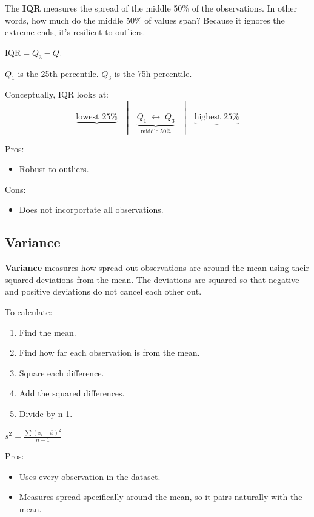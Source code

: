 \documentclass[
  letterpaper,
  DIV=11,
  numbers=noendperiod]{scrreprt}
\providecommand{\tightlist}{%
  \setlength{\itemsep}{0pt}\setlength{\parskip}{0pt}}
\begin{document}
The \textbf{IQR} measures the spread of the middle 50\% of the
observations. In other words, how much do the middle 50\% of values
span? Because it ignores the extreme ends, it's resilient to outliers.

\(\text{IQR} = Q_3 - Q_1\)

\(Q_1\) is the 25th percentile. \(Q_3\) is the 75h percentile.

Conceptually, IQR looks at: \[
\underbrace{\text{lowest 25\%}}_{\phantom{x}}
\quad|\quad
\underbrace{Q_1\; \longleftrightarrow\; Q_3}_{\text{middle 50\%}}
\quad|\quad
\underbrace{\text{highest 25\%}}_{\phantom{x}}
\]

Pros:

\begin{itemize}
\tightlist
\item
  Robust to outliers.
\end{itemize}

Cons:

\begin{itemize}
\tightlist
\item
  Does not incorportate all observations.
\end{itemize}

\subsection{Variance}\label{variance}

\textbf{Variance} measures how spread out observations are around the
mean using their squared deviations from the mean. The deviations are
squared so that negative and positive deviations do not cancel each
other out.

To calculate:

\begin{enumerate}
\def\labelenumi{\arabic{enumi}.}
\tightlist
\item
  Find the mean.
\item
  Find how far each observation is from the mean.
\item
  Square each difference.
\item
  Add the squared differences.
\item
  Divide by n-1.
\end{enumerate}

\(s^2 = \frac{\sum{(x_i - \bar{x})^2}}{n-1}\)

Pros:

\begin{itemize}
\tightlist
\item
  Uses every observation in the dataset.
\item
  Measures spread specifically around the mean, so it pairs naturally
  with the mean.
\end{itemize}
\end{document}
